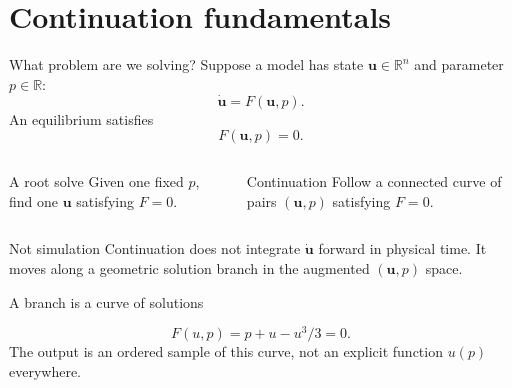\documentclass[aspectratio=169,10pt]{beamer}
\newcommand{\state}{\bm{u}}
\newcommand{\R}{\mathbb{R}}
\begin{document}
\section{Continuation fundamentals}

\begin{frame}{What problem are we solving?}
Suppose a model has state $\state\in\R^n$ and parameter $p\in\R$:
\[
  \dot{\state}=F(\state,p).
\]
An equilibrium satisfies
\[
  F(\state,p)=0.
\]
\begin{columns}[T]
\begin{block}{A root solve}
Given one fixed $p$, find one $\state$ satisfying $F=0$.
\end{block}
\begin{block}{Continuation}
Follow a connected curve of pairs $(\state,p)$ satisfying $F=0$.
\end{block}
\end{columns}
\vspace{4mm}
\begin{alertblock}{Not simulation}
Continuation does not integrate $\dot{\state}$ forward in physical time. It moves along a geometric solution branch in the augmented $(\state,p)$ space.
\end{alertblock}
\end{frame}

\begin{frame}{A branch is a curve of solutions}
\centering
{}
\vspace{-2mm}
\[
F(u,p)=p+u-u^3/3=0.
\]
The output is an ordered sample of this curve, not an explicit function $u(p)$ everywhere.
\end{frame}
\end{document}
